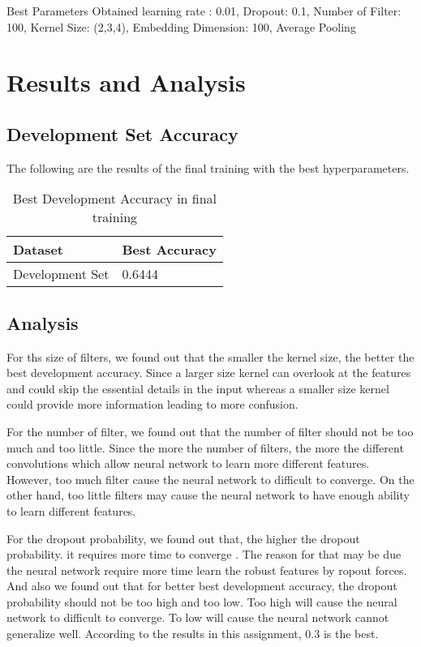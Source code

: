 \documentclass{article}
\begin{document}
Best Parameters Obtained { learning rate : 0.01, Dropout: 0.1, Number of Filter: 100, Kernel Size: (2,3,4),
 Embedding Dimension: 100, Average Pooling}

\pagebreak

\section{Results and Analysis}

\subsection{Development Set Accuracy}
The following are the results of the final training with the best hyperparameters.

\begin{table}[htb]
	\caption{Best Development Accuracy in final training}
	\label{sample-table}
	\centering
	\begin{tabular}{ll}
		\toprule
		\cmidrule{1-2}
		Dataset & Best Accuracy\\
		\midrule
		Development Set & 0.6444   \\
		\bottomrule
	\end{tabular}
\end{table}

\subsection{Analysis}
For ths size of filters, we found out that the smaller the kernel size, the better the best development accuracy. Since a larger size kernel can overlook at the features and could skip the essential details in the input whereas a smaller size kernel could provide more information leading to more confusion. 

For the number of filter, we found out that the number of filter should not be too much and too little. Since the more the number of filters, the more the different convolutions which allow neural network to learn more different features. However, too much filter cause the neural network to difficult to converge. On the other hand, too little filters may cause the neural network to have enough ability to learn different features.

For the dropout probability, we found out that, the higher the dropout probability. it requires more time to converge . The reason for that may be due the neural network require more time learn the robust features by  ropout forces. And also we found out that for better best development accuracy, the dropout probability should not be too high and too low. Too high will cause the neural network to difficult to converge. To low will cause the neural network cannot generalize well. According to the results in this assignment, 0.3 is the best.
\end{document}
